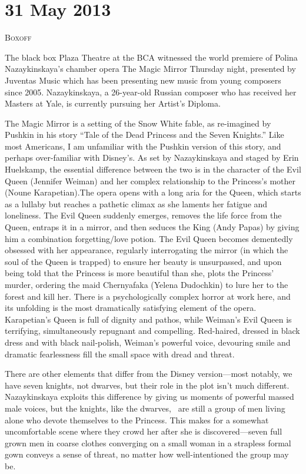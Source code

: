 \chapter{31 May 2013}

\textsc{Boxoff}

The black box Plaza Theatre at the BCA witnessed the world premiere of Polina Nazaykinskaya’s chamber opera The Magic Mirror Thursday night, presented by Juventas Music which has been presenting new music from young composers since 2005. Nazaykinskaya, a 26-year-old Russian composer who has received her Masters at Yale, is currently pursuing her Artist’s Diploma.

The Magic Mirror is a setting of the Snow White fable, as re-imagined by Pushkin in his story “Tale of the Dead Princess and the Seven Knights.” Like most Americans, I am unfamiliar with the Pushkin version of this story, and perhaps over-familiar with Disney’s. As set by Nazaykinskaya and staged by Erin Huelskamp, the essential difference between the two is in the character of the Evil Queen (Jennifer Weiman) and her complex relationship to the Princess’s mother (Noune Karapetian).The opera opens with a long aria for the Queen, which starts as a lullaby but reaches a pathetic climax as she laments her fatigue and loneliness. The Evil Queen suddenly emerges, removes the life force from the Queen, entraps it in a mirror, and then seduces the King (Andy Papas) by giving him a combination forgetting/love potion. The Evil Queen becomes dementedly obsessed with her appearance, regularly interrogating the mirror (in which the soul of the Queen is trapped) to ensure her beauty is unsurpassed, and upon being told that the Princess is more beautiful than she, plots the Princess’ murder, ordering the maid Chernyafaka (Yelena Dudochkin) to lure her to the forest and kill her. There is a psychologically complex horror at work here, and its unfolding is the most dramatically satisfying element of the opera. Karapetian’s Queen is full of dignity and pathos, while Weiman’s Evil Queen is terrifying, simultaneously repugnant and compelling. Red-haired, dressed in black dress and with black nail-polish, Weiman’s powerful voice, devouring smile and dramatic fearlessness fill the small space with dread and threat.

There are other elements that differ from the Disney version—most notably, we have seven knights, not dwarves, but their role in the plot isn’t much different. Nazaykinskaya exploits this difference by giving us moments of powerful massed male voices, but the knights, like the dwarves,  are still a group of men living alone who devote themselves to the Princess. This makes for a somewhat uncomfortable scene where they crowd her after she is discovered—seven full grown men in coarse clothes converging on a small woman in a strapless formal gown conveys a sense of threat, no matter how well-intentioned the group may be.

